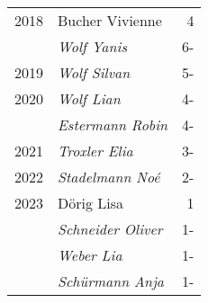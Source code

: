 {\begin{longtable}{ l l r }
        2018          & Bucher Vivienne                           & 4           \\
                      & \emph{Wolf Yanis}                         & 6-          \\
        2019          & \emph{Wolf Silvan}                        & 5-          \\
        2020          & \emph{Wolf Lian}                          & 4-          \\
                      & \emph{Estermann Robin}                    & 4-          \\
        2021          & \emph{Troxler Elia}                       & 3-          \\
        2022          & \emph{Stadelmann Noé}                     & 2-          \\
        2023          & Dörig Lisa                                & 1           \\
                      & \emph{Schneider Oliver}                   & 1-          \\
                      & \emph{Weber Lia}                          & 1-          \\
                      & \emph{Schürmann Anja}                     & 1-          \\
    \end{longtable}
    \unskip
    \unpenalty
    \unpenalty}


\begin{history}
    \unvbox\mitgliederbox
\end{history}

